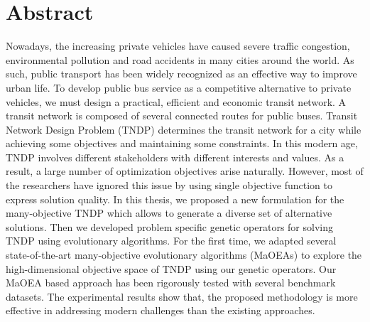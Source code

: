 \chapter*{Abstract}
 Nowadays, the increasing private vehicles have caused severe traffic congestion, environmental pollution and road accidents in many cities around the world. As such, public transport has been widely recognized as an effective way to improve urban life. To develop public bus service as a competitive alternative to private vehicles, we must design a practical, efficient and economic transit network. A transit network is composed of several connected routes for public buses. Transit Network Design Problem (TNDP) determines the transit network for a city while achieving some objectives and maintaining some constraints. In this modern age, TNDP involves different stakeholders with different interests and values. As a result, a large number of optimization objectives arise naturally. However, most of the researchers have ignored this issue by using single objective function to express solution quality. 
In this thesis, we proposed a new formulation for the many-objective TNDP which allows to generate a diverse set of alternative solutions. Then we developed problem specific genetic operators for solving TNDP using evolutionary algorithms. For the first time, we adapted several state-of-the-art many-objective evolutionary algorithms (MaOEAs) to explore the high-dimensional objective space of TNDP using our genetic operators. Our MaOEA based approach has been rigorously tested with several benchmark datasets. The experimental results show that, the proposed methodology is more effective in addressing modern challenges than the existing approaches.






